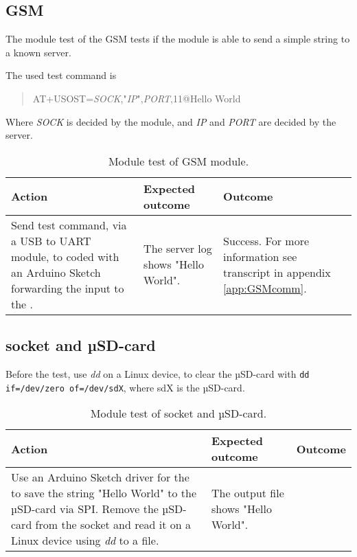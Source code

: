 \subsection{GSM \SARA}
The module test of the GSM \SARA tests if the module is able to send a simple string to a known server.

The used test command is
\begin{quote}
	AT+USOST=\textit{SOCK},"\textit{IP}",\textit{PORT},11@Hello World
\end{quote}
Where \textit{SOCK} is decided by the \SARA module, and \textit{IP} and \textit{PORT} are decided by the server.

\begin{table}[H]
	\centering
	\begin{tabularx}{\textwidth}{p{4.3cm} X X}
		\toprule
		\textbf{Action} & \textbf{Expected outcome} & \textbf{Outcome} \\
		\midrule
		Send test command, via a USB to UART module, to \MKR coded with an Arduino Sketch forwarding the input to the \SARA. & The server log shows "Hello World". & Success. For more information see transcript in appendix \cref{app:GSMcomm}. \\
		\bottomrule
	\end{tabularx}
	\caption{Module test of \SARA GSM module.}
	\label{AT:modGSM}
\end{table}

\subsection{\SDsock socket and µSD-card}
Before the test, use \textit{dd} on a Linux device, to clear the µSD-card with \texttt{dd if=/dev/zero of=/dev/sdX}, where sdX is the µSD-card.

\begin{table}[H]
	\centering
	\begin{tabularx}{\textwidth}{p{4.3cm} X X}
		\toprule
		\textbf{Action} & \textbf{Expected outcome} & \textbf{Outcome} \\
		\midrule
		Use an Arduino Sketch driver for the \MKR to save the string "Hello World" to the µSD-card via SPI.
		Remove the µSD-card from the \SDsock socket and read it on a Linux device using \textit{dd} to a file. & The output file shows "Hello World". & \\
		\bottomrule
	\end{tabularx}
	\caption{Module test of \SDsock socket and µSD-card.}
	\label{AT:modSD}
\end{table}

